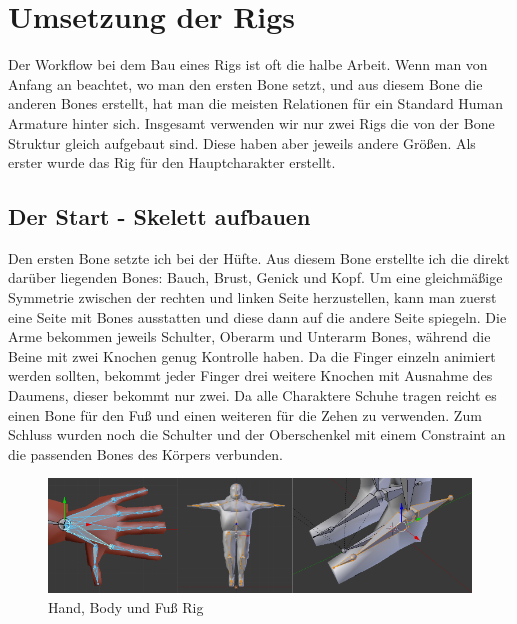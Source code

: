 \section{Umsetzung der Rigs}
Der Workflow bei dem Bau eines Rigs ist oft die halbe Arbeit. Wenn man von Anfang an beachtet,
wo man den ersten Bone setzt, und aus diesem Bone die anderen Bones erstellt, hat man die meisten Relationen für ein Standard Human Armature hinter sich.
Insgesamt verwenden wir nur zwei Rigs die von der Bone Struktur gleich aufgebaut sind.
Diese haben aber jeweils andere Größen. Als erster wurde das Rig für den Hauptcharakter erstellt.

\subsection{Der Start - Skelett aufbauen}
Den ersten Bone setzte ich bei der Hüfte. Aus diesem Bone erstellte ich die direkt darüber liegenden Bones: Bauch, Brust, Genick und Kopf.
Um eine gleichmäßige Symmetrie zwischen der rechten und linken Seite herzustellen, kann man zuerst eine Seite mit Bones ausstatten und diese dann auf die andere Seite spiegeln.
Die Arme bekommen jeweils Schulter, Oberarm und Unterarm Bones, während die Beine mit zwei Knochen genug Kontrolle haben. Da die Finger einzeln animiert werden sollten,
bekommt jeder Finger drei weitere Knochen mit Ausnahme des Daumens, dieser bekommt nur zwei. Da alle Charaktere Schuhe tragen reicht es einen Bone für den Fuß und einen weiteren
für die Zehen zu verwenden.
Zum Schluss wurden noch die Schulter und der Oberschenkel mit einem Constraint an die passenden Bones des Körpers verbunden.

\begin{figure}[H]
    \centering

    \includegraphics[width=.8\textwidth]{images/rigging_umsetzung.png}
    \caption{Hand, Body und Fuß Rig}
\end{figure}

